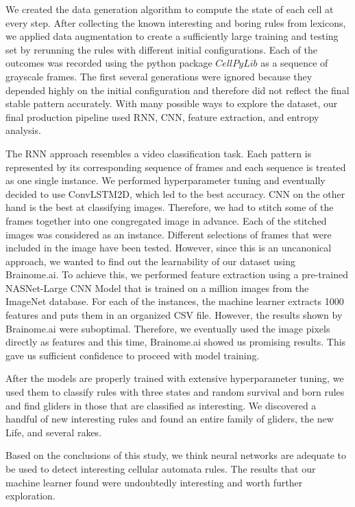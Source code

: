 \documentclass[12pt]{article}
\numberwithin{figure}{section} %
\begin{document}
We created the data generation algorithm to compute the state of each cell at every step. After collecting the known interesting and boring rules from lexicons, we applied data augmentation to create a sufficiently large training and testing set by rerunning the rules with different initial configurations. Each of the outcomes was recorded using the python package $CellPyLib$ as a sequence of grayscale frames. The first several generations were ignored because they depended highly on the initial configuration and therefore did not reflect the final stable pattern accurately. With many possible ways to explore the dataset, our final production pipeline used RNN, CNN, feature extraction, and entropy analysis. 

The RNN approach resembles a video classification task. Each pattern is represented by its corresponding sequence of frames and each sequence is treated as one single instance. We performed hyperparameter tuning and eventually decided to use ConvLSTM2D, which led to the best accuracy. CNN on the other hand is the best at classifying images. Therefore, we had to stitch some of the frames together into one congregated image in advance. Each of the stitched images was considered as an instance. Different selections of frames that were included in the image have been tested. However, since this is an uncanonical approach, we wanted to find out the learnability of our dataset using Brainome.ai. To achieve this, we performed feature extraction using a pre-trained NASNet-Large CNN Model that is trained on a million images from the ImageNet database. For each of the instances, the machine learner extracts 1000 features and puts them in an organized CSV file. However, the results shown by Brainome.ai were suboptimal. Therefore, we eventually used the image pixels directly as features and this time, Brainome.ai showed us promising results. This gave us sufficient confidence to proceed with model training. 

After the models are properly trained with extensive hyperparameter tuning, we used them to classify rules with three states and random survival and born rules and find gliders in those that are classified as interesting. We discovered a handful of new interesting rules and found an entire family of gliders, the new Life, and several rakes. 

Based on the conclusions of this study, we think neural networks are adequate to be used to detect interesting cellular automata rules. The results that our machine learner found were undoubtedly interesting and worth further exploration. 
\end{document}
